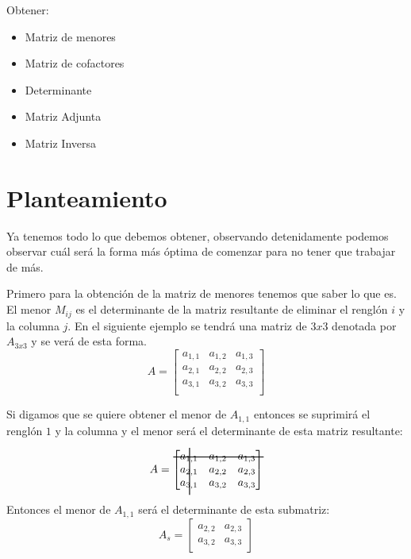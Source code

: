 \documentclass{article}
\begin{document}
Obtener:
\begin{itemize}
   \item Matriz de menores
   \item Matriz de cofactores
   \item Determinante
   \item Matriz Adjunta
   \item Matriz Inversa
\end{itemize}


\section{Planteamiento}
Ya tenemos todo lo que debemos obtener, observando detenidamente podemos observar
cuál será la forma más óptima de comenzar para no tener que trabajar de más.


Primero para la obtención de la matriz de menores tenemos que saber lo que es. El
menor $M_{ij}$ es el determinante de la matriz resultante de eliminar el renglón $i$
y la columna $j$. En el siguiente ejemplo se tendrá una matriz de $3x3$ denotada por
$A_{3x3}$ y se verá de esta forma.
\begin{equation*}
   A =
   \begin{bmatrix}
       a_{1,1}   &  a_{1,2}  &a_{1,3} \\
       a_{2,1} & a_{2,2} &  a_{2,3} \\
       a_{3,1} &  a_{3,2}  & a_{3,3} \\
   \end{bmatrix}
\end{equation*}


Si digamos que se quiere obtener el menor de $A_{1,1}$ entonces se suprimirá el renglón
$1$ y la columna y el menor será el determinante de esta matriz resultante:


\begin{equation*}
   A =
   \begin{bmatrix}
       a_{1,1}  \makebox(-15,0){\rule[-15ex]{0.8pt}{10ex}}& a_{1,2} \makebox(-15,0){\rule[1ex]{19ex}{0.8pt}} & a_{1,3} \\
       a_{2,1} & a_{2,2} &  a_{2,3} \\
       a_{3,1} &  a_{3,2}  & a_{3,3} \\
   \end{bmatrix}
\end{equation*}


Entonces el menor de $A_{1,1}$ será el determinante de esta submatriz:
\begin{equation*}
   A_s =
   \begin{bmatrix}
       a_{2,2} &  a_{2,3} \\
       a_{3,2}  & a_{3,3}
   \end{bmatrix}
\end{equation*}
\end{document}
